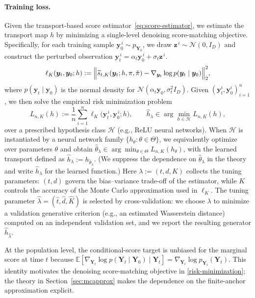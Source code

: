 \documentclass[12pt]{article}
\theoremstyle{definition} %
\newcommand{\Y}{\bm Y}
\newcommand{\y}{\bm y}
\newcommand{\z}{\bm z}
\providecommand{\E}{\mathbb{E}}
\begin{document}
\paragraph{Training loss.}
Given the transport-based score estimator~\eqref{eq:score-estimator}, we estimate the transport map $h$ by minimizing a single-level denoising score-matching objective. Specifically, for each training sample $\y_0^{\,i}\sim p_{\Y_0}$, we draw $\z^{\,i}\sim\mathcal{N}(0,I_D)$ and construct the perturbed observation
$\y_t^{\,i}=\alpha_t \y_0^{\,i}+\sigma_t \z^{\,i}$.
\begin{equation}
\label{eq:ellK-def}
\ell_K(\y_t,\y_0;h)
:=
\Bigl\|
  \widetilde s_{t,K}(\y_t;h,\pi,\tilde\pi)
  - \nabla_{\y_t} \log p(\y_t\mid \y_0)
\Bigr\|_2^2,
\end{equation}
where $p(\y_t\mid \y_0)$ is the normal density for $\mathcal{N}(\alpha_t\y_0,\sigma_t^2 I_D)$. Given $(\y^i_t,\y^i_0)_{i=1}^n$, 
we then solve the empirical risk minimization problem
\begin{equation}
\label{risk-minimization}
L_{n,K}(h)
:=
\frac{1}{n}\sum_{i=1}^n \ell_K\!\bigl(\y_t^{\,i},\y_0^{\,i};h\bigr),
\qquad
\hat h_{\lambda}\in\arg\min_{h\in\mathcal{H}} L_{n,K}(h),
\end{equation}
over a prescribed hypothesis class $\mathcal{H}$ (e.g., ReLU neural networks).
When $\mathcal{H}$ is instantiated by a neural network family $\{h_{\theta}:\theta\in\Theta\}$, we equivalently optimize over parameters $\theta$ and obtain
$\hat\theta_{\lambda}\in\arg\min_{\theta\in\Theta} L_{n,K}(h_{\theta})$, with the learned transport defined as $\hat h_{\lambda}:=h_{\hat\theta_{\lambda}}$.
(We suppress the dependence on $\hat\theta_{\lambda}$ in the theory and write $\hat h_{\lambda}$ for the learned function.)
Here $\lambda := (t,d,K)$ collects the tuning parameters: $(t,d)$ govern the
bias--variance trade-off of the estimator, while $K$ controls the accuracy of the
Monte Carlo approximation used in $\ell_K$.
The tuning parameter $\hat\lambda=(\hat t,\hat d,\hat K)$ is selected by cross-validation: we choose $\lambda$ to minimize a validation generative criterion (e.g., an estimated Wasserstein distance) computed on an independent validation set, and we report the resulting generator $\hat h_{\hat\lambda}$.



At the population level, the conditional-score target is unbiased for the marginal score at time $t$ because
$\E[\nabla_{\Y_t}\log p(\Y_t\mid \Y_0)\mid \Y_t]=\nabla_{\Y_t}\log p_{\Y_t}(\Y_t)$.
This identity motivates the denoising score-matching objective in \eqref{risk-minimization}; the theory in Section~\ref{sec:mcapprox} makes the dependence on the finite-anchor 
approximation explicit.
\end{document}
